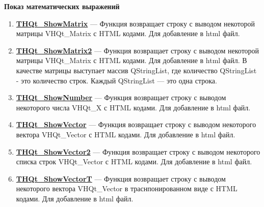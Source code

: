 \documentclass[a4paper,12pt]{article}
\begin{document}
\textbf{Показ математических выражений}
\begin{enumerate}

\item \textbf{\hyperref[THQt_ShowMatrix]{THQt\_ShowMatrix}} --- Функция возвращает строку с выводом некоторой матрицы VHQt\_Matrix с HTML кодами. Для добавление в html файл.

\item \textbf{\hyperref[THQt_ShowMatrix2]{THQt\_ShowMatrix2}} --- Функция возвращает строку с выводом некоторой матрицы VHQt\_Matrix с HTML кодами. Для добавление в html файл. В качестве матрицы выступает массив QStringList, где количество QStringList - это количество строк. Каждый QStringList --- это одна строка.

\item \textbf{\hyperref[THQt_ShowNumber]{THQt\_ShowNumber}} --- Функция возвращает строку с выводом некоторого числа VHQt\_X с HTML кодами. Для добавление в html файл.

\item \textbf{\hyperref[THQt_ShowVector]{THQt\_ShowVector}} --- Функция возвращает строку с выводом некоторого вектора VHQt\_Vector с HTML кодами. Для добавление в html файл.

\item \textbf{\hyperref[THQt_ShowVector2]{THQt\_ShowVector2}} --- Функция возвращает строку с выводом некоторого списка строк VHQt\_Vector с HTML кодами. Для добавление в html файл.

\item \textbf{\hyperref[THQt_ShowVectorT]{THQt\_ShowVectorT}} --- Функция возвращает строку с выводом некоторого вектора VHQt\_Vector в траснпонированном виде с HTML кодами. Для добавление в html файл.

\end{enumerate}
\end{document}
